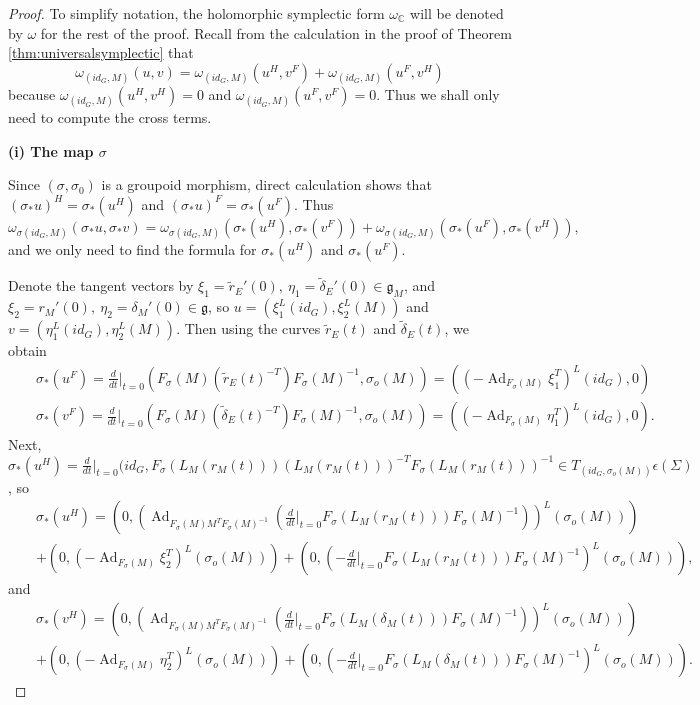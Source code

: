 \documentclass[10pt,a4paper]{amsart}
\DeclareMathOperator{\Ad}{Ad}
\newcommand{\bC}{\mathbb{C}}
\newcommand{\fg}{\mathfrak{g}}
\begin{document}
\begin{proof}
To simplify notation, the holomorphic symplectic form $\omega_\bC$ will be denoted by $\omega$ for the rest of the proof. Recall from the calculation in the proof of Theorem \ref{thm:universalsymplectic} that
$$\omega_{(id_G,M)}(u,v)=\omega_{(id_G,M)}(u^H,v^F)+\omega_{(id_G,M)}(u^F,v^H)$$
because $\omega_{(id_G,M)}(u^H,v^H)=0$ and $\omega_{(id_G,M)}(u^F,v^F)=0$. Thus we shall only need to compute the cross terms.

{\bf (i) The map $\sigma$}

Since $(\sigma,\sigma_0)$ is a groupoid morphism, direct calculation shows that $(\sigma_*u)^H=\sigma_*(u^H)$ and $(\sigma_*u)^F=\sigma_*(u^F)$. 
Thus $\omega_{\sigma(id_G,M)}(\sigma_*u,\sigma_*v)=\omega_{\sigma(id_G,M)}(\sigma_*(u^H),\sigma_*(v^F))
+\omega_{\sigma(id_G,M)}(\sigma_*(u^F),\sigma_*(v^H)),$  and  we only need to find the formula for $\sigma_*(u^H)$ and $\sigma_*(u^F)$.

Denote the tangent vectors by $\xi_1=\tilde{r}_E'(0),~\eta_1=\tilde{\delta}_E'(0)\in \fg_M$, and $\xi_2=r_M'(0), ~\eta_2=\delta_M'(0)\in\fg$, so $u=( \xi_1^L(id_G),\xi_2^L(M) )$ and $v=(\eta_1^L(id_G),\eta^L_2(M))$.
Then using the curves $\tilde{r}_E(t)$ and $\tilde{\delta}_E(t)$, we obtain
\begin{eqnarray*}
&&\sigma_*(u^F)=\tfrac{d}{dt}|_{t=0} \left( F_\sigma(M)(\tilde{r}_E(t)^{-T})F_\sigma(M)^{-1},  \sigma_o(M) \right)=\left( (-\Ad_{F_\sigma(M)} \xi_1^T)^L (id_G), 0 \right) \\
&&\sigma_*(v^F)=\tfrac{d}{dt}|_{t=0} \left( F_\sigma(M)(\tilde{\delta}_E(t)^{-T})F_\sigma(M)^{-1},  \sigma_o(M) \right)=\left( (-\Ad_{F_\sigma(M)}\eta_1^T)^L(id_G),0 \right).
\end{eqnarray*}
Next, $\sigma_*(u^H)=\frac{d}{dt}|_{t=0} (id_G, F_\sigma(L_M(r_M(t))) (L_M(r_M(t)))^{-T} F_\sigma(L_M(r_M(t)))^{-1} \in T_{(id_G,\sigma_o(M))}\epsilon(\Sigma)$, so
\begin{eqnarray*}
&&\sigma_*(u^H)=\left( 0, \left(\Ad_{F_\sigma(M) M^T F_\sigma(M)^{-1}}( \tfrac{d}{dt}|_{t=0}F_\sigma(L_M(r_M(t)))F_\sigma(M)^{-1}) \right)^L (\sigma_o(M)) \right) \\&&
+ \left( 0, \left( -\Ad_{F_\sigma(M)}\xi_2^T \right)^L(\sigma_o(M) ) \right) + \left( 0,\left( -\tfrac{d}{dt}|_{t=0}F_\sigma(L_M(r_M(t)))F_\sigma(M)^{-1} \right)^L( \sigma_o(M) ) \right),
\end{eqnarray*}
and
\begin{eqnarray*}
&&\sigma_*(v^H)=\left( 0, \left(\Ad_{F_\sigma(M)M^TF_\sigma(M)^{-1}}( \tfrac{d}{dt}|_{t=0}F_\sigma(L_M(\delta_M(t)))F_\sigma(M)^{-1}) \right)^L (\sigma_o(M) ) \right) \\&&
+ \left( 0, \left(-\Ad_{F_\sigma(M)}\eta_2^T\right)^L(\sigma_o(M) )\right) + \left( 0, \left(-\tfrac{d}{dt}|_{t=0}F_\sigma(L_M(\delta_M(t)))F_\sigma(M)^{-1} \right)^L( \sigma_o(M) ) \right).
\end{eqnarray*}


\end{proof}
\end{document}
